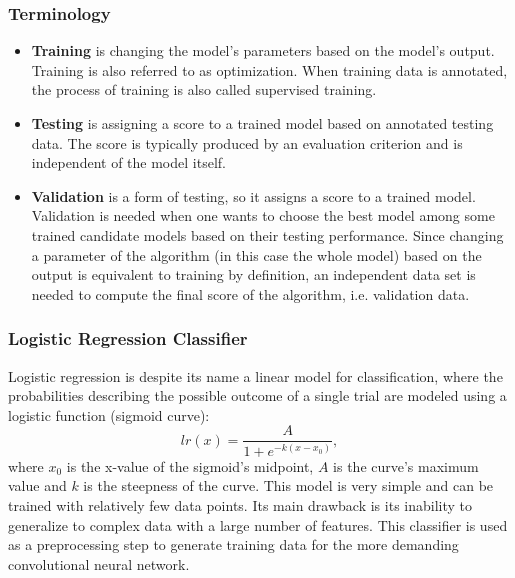 		\subsubsection{Terminology}
			\begin{itemize} 
				\item \textbf{Training} is changing the model's parameters based on the model's output. Training is also referred to as optimization. When training data is annotated, the process of training is also called supervised training. 
				\item \textbf{Testing} is assigning a score to a trained model based on annotated testing data. The score is typically produced by an evaluation criterion and is independent of the model itself. 
				\item \textbf{Validation} is a form of testing, so it assigns a score to a trained model. Validation is needed when one wants to choose the best model among some trained candidate models based on their testing performance. Since changing a parameter of the algorithm (in this case the whole model) based on the output is equivalent to training by definition, an independent data set is needed to compute the final score of the algorithm, i.e. validation data. 
			\end{itemize}				
			
		\subsubsection{Logistic Regression Classifier}
			Logistic regression is despite its name a linear model for classification, where the probabilities describing the possible outcome of a single trial are modeled using a logistic function (sigmoid curve):
			\begin{equation}
				lr(x) = \dfrac{A}{1 + e^{-k (x-x_0)}},
			\end{equation}
		where $x_0$ is the x-value of the sigmoid's midpoint, $A$ is the curve's maximum value and $k$ is the steepness of the curve. This model is very simple and can be trained with relatively few data points. Its main drawback is its inability to generalize to complex data with a large number of features. This classifier is used as a preprocessing step to generate training data for the more demanding convolutional neural network. 
		
